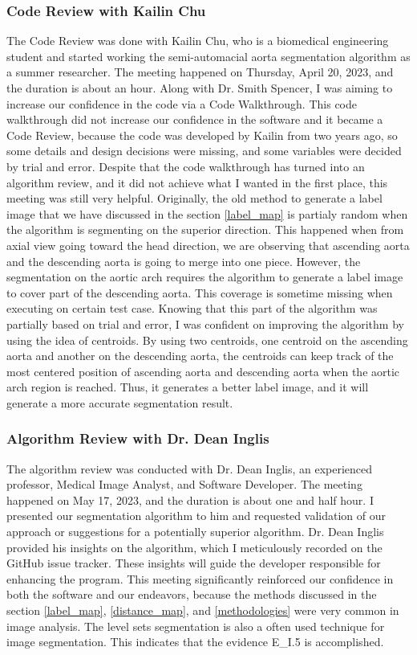 \subsubsection{Code Review with Kailin Chu}
The Code Review was done with Kailin Chu, who is a biomedical engineering student and started working the semi-automacial aorta segmentation algorithm as a summer researcher. The meeting happened on Thursday, April 20, 2023, and the duration is about an hour. Along with Dr. Smith Spencer, I was aiming to increase our confidence in the code via a Code Walkthrough. This code walkthrough did not increase our confidence in the software and it became a Code Review, because the code was developed by Kailin from two years ago, so some details and design decisions were missing, and some variables were decided by trial and error. Despite that the code walkthrough has turned into an algorithm review, and it did not achieve what I wanted in the first place, this meeting was still very helpful. Originally, the old method to generate a label image that we have discussed in the section \ref{label_map} is partialy random when the algorithm is segmenting on the superior direction. This happened when from axial view going toward the head direction, we are observing that ascending aorta and the descending aorta is going to merge into one piece. However, the segmentation on the aortic arch requires the algorithm to generate a label image to cover part of the descending aorta. This coverage is sometime missing when executing on certain test case. Knowing that this part of the algorithm was partially based on trial and error, I was confident on improving the algorithm by using the idea of centroids. By using two centroids, one centroid on the ascending aorta and another on the descending aorta, the centroids can keep track of the most centered position of ascending aorta and descending aorta when the aortic arch region is reached. Thus, it generates a better label image, and it will generate a more accurate segmentation result.

\subsubsection{Algorithm Review with Dr. Dean Inglis}

The algorithm review was conducted with Dr. Dean Inglis, an experienced professor, Medical Image Analyst, and Software Developer. The meeting happened on May 17, 2023, and the duration is about one and half hour. I presented our segmentation algorithm to him and requested validation of our approach or suggestions for a potentially superior algorithm. Dr. Dean Inglis provided his insights on the algorithm, which I meticulously recorded on the GitHub issue tracker. These insights will guide the developer responsible for enhancing the program. This meeting significantly reinforced our confidence in both the software and our endeavors, because the methods discussed in the section \ref{label_map}, \ref{distance_map}, and \ref{methodologies}  were very common in image analysis. The level sets segmentation is also a often used technique for image segmentation. This indicates that the evidence E\_I.5 is accomplished.

